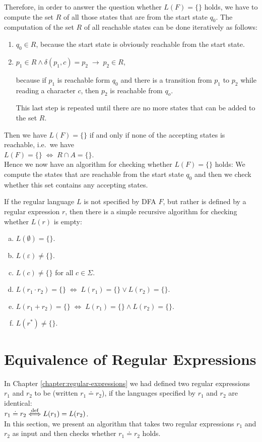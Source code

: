 Therefore, in order to answer the question whether $L(F) = \{\}$ holds, we have to compute the set $R$
of all those states that are  from the start state $q_0$.  The computation of the set $R$ of
all reachable states can be done iteratively as follows:
\begin{enumerate}
\item $q_0 \in R$, \quad because the start state is obviously reachable from the start state.
\item $p_1 \in R \wedge \delta(p_1,c) = p_2 \;\rightarrow\; p_2 \in R$,

      because if $p_1$ is reachable form $q_0$ and there is a transition from $p_1$ to $p_2$ while reading a
      character $c$, then $p_2$ is reachable from $q_o$.

      This last step is repeated until there are no more states that can be added to the set $R$.
\end{enumerate}
Then we have $L(F) = \{\}$ if and only if none of the accepting states is reachable, i.e.~we have
\\[0.2cm]
\hspace*{1.3cm}
$L(F) = \{\} \;\Leftrightarrow\; R \cap A = \{\}$.
\\[0.2cm]
Hence we now have an algorithm for checking whether $L(F) = \{\}$ holds:
We compute the states that are reachable from the start state $q_0$ and then we check whether this set
contains any accepting states.

\remarkEng
If the regular language  $L$ is not specified by \textsc{DFA} $F$, but rather is defined
by a regular expression $r$, then there is a simple recursive algorithm for checking whether 
$L(r)$ is empty:
\begin{enumerate}[(a)]
\item $L(\emptyset) = \{\}$.
\item $L(\varepsilon) \not= \{\}$.
\item $L(c) \not= \{\}$ \quad for all $c \in \Sigma$.
\item $L(r_1 \cdot r_2) = \{\} \;\Leftrightarrow\; L(r_1) = \{\} \vee L(r_2) = \{\}$.
\item $L(r_1 + r_2) = \{\} \;\Leftrightarrow\; L(r_1) = \{\} \wedge L(r_2) = \{\}$.
\item $L(r^*) \not= \{\}$. \eox
\end{enumerate}


\section{Equivalence of Regular Expressions}
In Chapter \ref{chapter:regular-expressions} we had defined two regular expressions $r_1$ and $r_2$ to be  
(written $r_1 \doteq r_2$), if the languages specified by $r_1$ and $r_2$ are identical:
\\[0.2cm]
\hspace*{1.3cm}
$r_1 \doteq r_2 \stackrel{\mbox{\scriptsize def}}{\Longleftrightarrow} L(r_1) = L(r_2)$. 
\\[0.2cm]
In this section, we present an algorithm that takes two regular expressions $r_1$ and $r_2$ as input and then
checks whether $r_1 \doteq r_2$ holds. 


